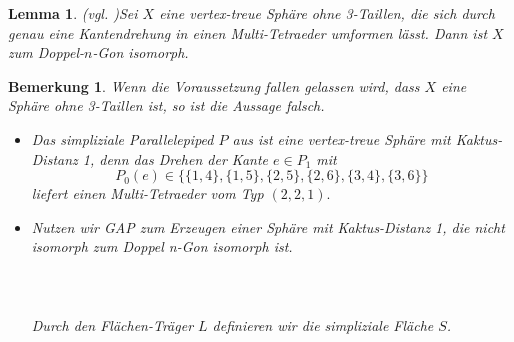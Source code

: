 \documentclass[12pt,titlepage,twoside,cleardoublepage]{article}
\theoremstyle{nummermitklammern}
\newtheorem{lemma}[temp]{Lemma}
\newtheorem{bemerkung}[temp]{Bemerkung}
\newtheorem{lemma}[zahl]{Lemma}
\newtheorem{bemerkung}[zahl]{Bemerkung}
\numberwithin{equation}{section}
\begin{document}
\begin{lemma}{\textsc{(}vgl. \textsc{\cite{simp})}}\label{cacdis1}
Sei $X$ eine vertex-treue Sphäre ohne 3-Taillen, die  sich durch genau eine Kantendrehung in einen Multi-Tetraeder umformen lässt. Dann ist $X$ zum Doppel-$n$-Gon isomorph.
\end{lemma}
\begin{bemerkung}
Wenn die Voraussetzung fallen gelassen wird, dass $X$ eine Sphäre ohne 3-Taillen ist, so ist die Aussage falsch. 
\begin{itemize}
\item Das simpliziale Parallelepiped $P$ aus  ist eine vertex-treue Sphäre mit Kaktus-Distanz 1, denn das Drehen der Kante $e\in P_1$ mit 
\[
P_0(e)\in\{\{1,4\},\{1,5\},\{2,5\},\{2,6\},\{3,4\},\{3,6\}\}
\] liefert einen Multi-Tetraeder vom Typ $(2,2,1).$
\item Nutzen wir GAP zum Erzeugen einer Sphäre mit Kaktus-Distanz 1, die nicht isomorph zum Doppel n-Gon isomorph ist. \\\\
\fbox{
\parbox{13.4cm}{
\textcolor{red}{$gap>$} \textcolor{blue}{$L:=[[ 2, 3, 5 ], [ 2, 4, 5 ], [ 3, 4, 5 ], [ 1, 3, 6 ], [ 1, 4, 6 ], 
  [ 3, 4, 6 ], [ 1, 7, 8 ], [ 1, 4, 7 ],\newline [ 2, 4, 7 ], [ 2, 7, 8 ], [ 1, 3, 8 ], [ 2, 3, 8 ] ];;$}
  }}\\\\
  Durch den Flächen-Träger $L$ definieren wir die simpliziale Fläche $S$.\\\\
  \\\\
\begin{figure}[H]
\begin{center}

\end{center}
\end{figure}
\end{itemize}
\end{bemerkung}
\end{document}
